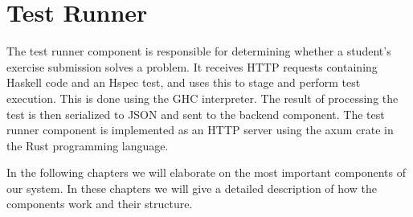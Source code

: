 \section{Test Runner}
The test runner component is responsible for determining whether a student's exercise submission solves a problem.
It receives HTTP requests containing Haskell code and an Hspec test, and uses this to stage and perform test execution.
This is done using the GHC interpreter.
The result of processing the test is then serialized to JSON and sent to the backend component.
The test runner component is implemented as an HTTP server using the axum crate in the Rust programming language.

In the following chapters we will elaborate on the most important components of our system. In these chapters we will give a detailed description of how the components work and their structure.